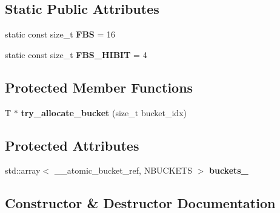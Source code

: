\subsection*{Static Public Attributes}
\begin{DoxyCompactItemize}
\item 
\mbox{\label{classdialog_1_1monolog_1_1monolog__exp2__base_af51f7c1502c45d94f2f85a173ddccce6}} 
static const size\+\_\+t {\bfseries F\+BS} = 16
\item 
\mbox{\label{classdialog_1_1monolog_1_1monolog__exp2__base_a8dc41c856d845d71fa96ce35a1918259}} 
static const size\+\_\+t {\bfseries F\+B\+S\+\_\+\+H\+I\+B\+IT} = 4
\end{DoxyCompactItemize}
\subsection*{Protected Member Functions}
\begin{DoxyCompactItemize}
\item 
\mbox{\label{classdialog_1_1monolog_1_1monolog__exp2__base_a2566df9503c1dae556d2430535a8fa26}} 
T $\ast$ {\bfseries try\+\_\+allocate\+\_\+bucket} (size\+\_\+t bucket\+\_\+idx)
\end{DoxyCompactItemize}
\subsection*{Protected Attributes}
\begin{DoxyCompactItemize}
\item 
\mbox{\label{classdialog_1_1monolog_1_1monolog__exp2__base_a2abe7a8d0a1da433ba79fe4e340c461f}} 
std\+::array$<$ \+\_\+\+\_\+atomic\+\_\+bucket\+\_\+ref, N\+B\+U\+C\+K\+E\+TS $>$ {\bfseries buckets\+\_\+}
\end{DoxyCompactItemize}


\subsection{Constructor \& Destructor Documentation}
\mbox{\label{classdialog_1_1monolog_1_1monolog__exp2__base_ac59fe74069159b44d64ed2395adb2fae}} 
